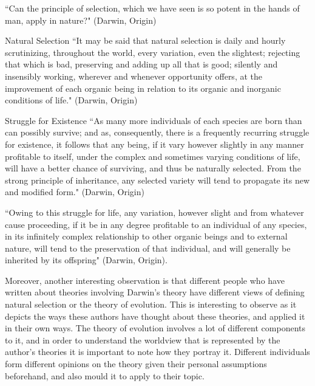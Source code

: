 \documentclass[11pt, oneside]{article}
\begin{document}
``Can the principle of selection, which we have seen is so potent in the hands of man, apply in nature?" (Darwin, Origin)

\par Natural Selection ``It may be said that natural selection is daily and hourly scrutinizing, throughout the world, every variation, even the slightest; rejecting that which is bad, preserving and adding up all that is good; silently and insensibly working, wherever and whenever opportunity offers, at the improvement of each organic being in relation to its organic and inorganic conditions of life." (Darwin, Origin)

\par Struggle for Existence ``As many more individuals of each species are born than can possibly survive; and as, consequently, there is a frequently recurring struggle for existence, it follows that any being, if it vary however slightly in any manner profitable to itself, under the complex and sometimes varying conditions of life, will have a better chance of surviving, and thus be naturally selected. From the strong principle of inheritance, any selected variety will tend to propagate its new and modified form." (Darwin, Origin)

\par ``Owing to this struggle for life, any variation, however slight and from whatever cause proceeding, if it be in any degree profitable to an individual of any species, in its infinitely complex relationship to other organic beings and to external nature, will tend to the preservation of that individual, and will generally be inherited by its offspring" (Darwin, Origin).




\par Moreover, another interesting observation is that different people who have written about theories involving Darwin's theory have different views of defining natural selection or the theory of evolution. This is interesting to observe as it depicts the ways these authors have thought about these theories, and applied it in their own ways. The theory of evolution involves a lot of different components to it, and in order to understand the worldview that is represented by the author's theories it is important to note how they portray it. Different individuals form different opinions on the theory given their personal assumptions beforehand, and also mould it to apply to their topic.
\end{document}
